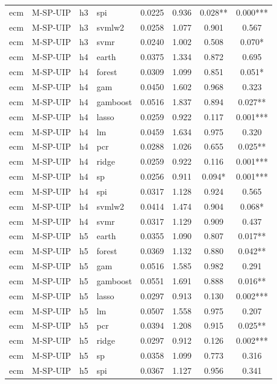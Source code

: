 \begin{ThreePartTable}
\begin{longtable}[t]{llclcccc}
ecm & M-SP-UIP & h3 & spi & 0.0225 & 0.936 & 0.028** & 0.000***\\
ecm & M-SP-UIP & h3 & svmlw2 & 0.0258 & 1.077 & 0.901 & 0.567\\
ecm & M-SP-UIP & h3 & svmr & 0.0240 & 1.002 & 0.508 & 0.070*\\
\addlinespace
ecm & M-SP-UIP & h4 & earth & 0.0375 & 1.334 & 0.872 & 0.695\\
ecm & M-SP-UIP & h4 & forest & 0.0309 & 1.099 & 0.851 & 0.051*\\
ecm & M-SP-UIP & h4 & gam & 0.0450 & 1.602 & 0.968 & 0.323\\
ecm & M-SP-UIP & h4 & gamboost & 0.0516 & 1.837 & 0.894 & 0.027**\\
ecm & M-SP-UIP & h4 & lasso & 0.0259 & 0.922 & 0.117 & 0.001***\\
ecm & M-SP-UIP & h4 & lm & 0.0459 & 1.634 & 0.975 & 0.320\\
ecm & M-SP-UIP & h4 & pcr & 0.0288 & 1.026 & 0.655 & 0.025**\\
ecm & M-SP-UIP & h4 & ridge & 0.0259 & 0.922 & 0.116 & 0.001***\\
ecm & M-SP-UIP & h4 & sp & 0.0256 & 0.911 & 0.094* & 0.001***\\
ecm & M-SP-UIP & h4 & spi & 0.0317 & 1.128 & 0.924 & 0.565\\
ecm & M-SP-UIP & h4 & svmlw2 & 0.0414 & 1.474 & 0.904 & 0.068*\\
ecm & M-SP-UIP & h4 & svmr & 0.0317 & 1.129 & 0.909 & 0.437\\
\addlinespace
ecm & M-SP-UIP & h5 & earth & 0.0355 & 1.090 & 0.807 & 0.017**\\
ecm & M-SP-UIP & h5 & forest & 0.0369 & 1.132 & 0.880 & 0.042**\\
ecm & M-SP-UIP & h5 & gam & 0.0516 & 1.585 & 0.982 & 0.291\\
ecm & M-SP-UIP & h5 & gamboost & 0.0551 & 1.691 & 0.888 & 0.016**\\
ecm & M-SP-UIP & h5 & lasso & 0.0297 & 0.913 & 0.130 & 0.002***\\
ecm & M-SP-UIP & h5 & lm & 0.0507 & 1.558 & 0.975 & 0.207\\
ecm & M-SP-UIP & h5 & pcr & 0.0394 & 1.208 & 0.915 & 0.025**\\
ecm & M-SP-UIP & h5 & ridge & 0.0297 & 0.912 & 0.126 & 0.002***\\
ecm & M-SP-UIP & h5 & sp & 0.0358 & 1.099 & 0.773 & 0.316\\
ecm & M-SP-UIP & h5 & spi & 0.0367 & 1.127 & 0.956 & 0.341\\

\end{longtable}
\end{ThreePartTable}
